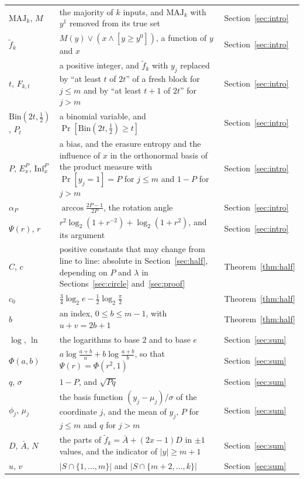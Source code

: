 \documentclass[11pt]{amsart}
\theoremstyle{remark}
\newcommand{\Inf}{\mathrm{Inf}}
\newcommand{\MAJ}{\mathrm{MAJ}}
\begin{document}
\begin{longtable}{@{}>{\raggedright\arraybackslash}p{}>{\raggedright\arraybackslash}p{}>{\raggedright\arraybackslash}p{}@{}}
$\MAJ_k$, $M$ & the majority of $k$ inputs, and $\MAJ_k$ with $y^1$ removed from its true set & Section~\ref{sec:intro} \\
$\tilde f_k$ & $M(y)\vee(x\wedge[y\ge y^0])$, a function of $y$ and $x$ & Section~\ref{sec:intro} \\
$t$, $F_{k,t}$ & a positive integer, and $\tilde f_k$ with $y_j$ replaced by ``at least $t$ of $2t$'' of a fresh block for $j\le m$ and by ``at least $t+1$ of $2t$'' for $j>m$ & Section~\ref{sec:intro} \\
$\mathrm{Bin}(2t,\frac12)$, $P_t$ & a binomial variable, and $\Pr[\mathrm{Bin}(2t,\frac12)\ge t]$ & Section~\ref{sec:intro} \\
$P$, $E_x^P$, $\Inf_x^P$ & a bias, and the erasure entropy and the influence of $x$ in the orthonormal basis of the product measure with $\Pr[y_j=1]=P$ for $j\le m$ and $1-P$ for $j>m$ & Section~\ref{sec:intro} \\
$\alpha_P$ & $\arccos\frac{2P-1}{2P}$, the rotation angle & Section~\ref{sec:intro} \\
$\Psi(r)$, $r$ & $r^2\log_2(1+r^{-2})+\log_2(1+r^2)$, and its argument & Section~\ref{sec:intro} \\
$C$, $c$ & positive constants that may change from line to line: absolute in Section~\ref{sec:half}, depending on $P$ and $\lambda$ in Sections~\ref{sec:circle} and~\ref{sec:proof} & Theorem~\ref{thm:half} \\
$c_0$ & $\frac34\log_2e-\frac12\log_2\frac\pi2$ & Theorem~\ref{thm:half} \\
$b$ & an index, $0\le b\le m-1$, with $u+v=2b+1$ & Theorem~\ref{thm:half} \\
$\log$, $\ln$ & the logarithms to base $2$ and to base $e$ & Section~\ref{sec:sum} \\
$\Phi(a,b)$ & $a\log\frac{a+b}a+b\log\frac{a+b}b$, so that $\Psi(r)=\Phi(r^2,1)$ & Section~\ref{sec:sum} \\
$q$, $\sigma$ & $1-P$, and $\sqrt{Pq}$ & Section~\ref{sec:sum} \\
$\phi_j$, $\mu_j$ & the basis function $(y_j-\mu_j)/\sigma$ of the coordinate $j$, and the mean of $y_j$, $P$ for $j\le m$ and $q$ for $j>m$ & Section~\ref{sec:sum} \\
$D$, $\bar A$, $N$ & the parts of $\tilde f_k=\bar A+(2x-1)D$ in $\pm1$ values, and the indicator of $|y|\ge m+1$ & Section~\ref{sec:sum} \\
$u$, $v$ & $|S\cap\{1,\dots,m\}|$ and $|S\cap\{m+2,\dots,k\}|$ & Section~\ref{sec:sum} \\

\end{longtable}
\end{document}
